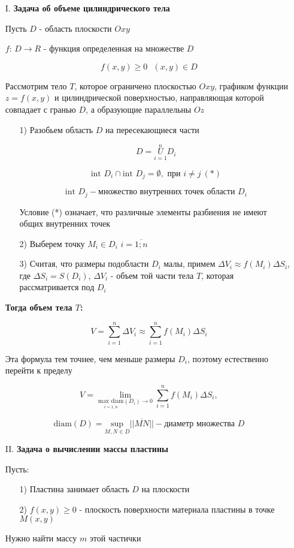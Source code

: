 \documentclass[a4paper, 14pt]{report}
\begin{document}
\begin{enumerate}
    \item[I.] \textbf{Задача об объеме цилиндрического тела}

    Пусть $D$ - область плоскости $Oxy$

    $f$: $D \to R$ - функция определенная на множестве $D$

    $$f(x, y) \geq 0\ \ \ (x, y) \in D$$

    Рассмотрим тело $T$, которое ограничено плоскостью $Oxy$, графиком функции $z = f(x,y)$ и цилиндрической поверхностью, направляющая которой совпадает с гранью $D$, а образующие параллельны $Oz$

        \begin{enumerate}
        \item[1)] Разобьем область $D$ на пересекающиеся части

        $$ D = \overset{n}{\underset{i = 1}{U}} D_i $$

        $$ \text{int } D_i \cap \text{int } D_j = \emptyset, \text{ при } i \ne j\ (*)$$

        $$ \text{int } D_j - \text{множество внутренних точек области } D_i $$

        Условие (*) означает, что различные элементы разбиения не имеют общих внутренних точек

        \item[2)] Выберем точку $M_i \in D_i$ $i = \overline{1;n}$

        \item[3)] Считая, что размеры подобласти $D_i$ малы, примем $\Delta V_i \approx f(M_i) \Delta S_i$, где $\Delta S_i = S(D_i)$, $\Delta V_i$ - объем той части тела $T$, которая рассматривается под $D_i$
        \end{enumerate}

    \textbf{Тогда объем тела $T$:}
    
    $$ V = \sum_{i=1}^n \Delta V_i \approx \sum_{i=1}^n f(M_i) \Delta S_i $$
    
    Эта формула тем точнее, чем меньше размеры $D_i$, поэтому естественно перейти к пределу
    
    $$ V = \lim_{\underset{i = \overline{1,n}}{\text{max diam}}(D_i) \to 0} \sum_{i=1}^n f(M_i) \Delta S_i,$$
    
    $$\text{diam} (D) = \underset{M,N \in D}{\text{sup}} || \overline{MN} || - \text{диаметр множества } D$$
    
    \item[II.] \textbf{Задача о вычислении массы пластины}
    
    Пусть: 
    
    \begin{enumerate}
        \item[1)] Пластина занимает область $D$ на плоскости
        \item[2)] $f(x,y) \geq 0$ - плоскость поверхности материала пластины в точке $M(x,y)$
    \end{enumerate}
    
    Нужно найти массу $m$ этой частички
\end{enumerate}
\end{document}

